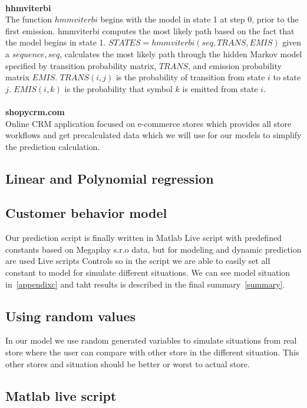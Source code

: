 \\
\textbf{hhmviterbi}~\cite{hhmviterbi}\\
The function $hmmviterbi$ begins with the model in state 1 at step 0, prior to the first emission.
hmmviterbi computes the most likely path based on the fact that the model begins in state 1.
$STATES = hmmviterbi(seq,TRANS,EMIS)$ given a $sequence, seq$, calculates the most likely path through the hidden Markov model
specified by transition probability matrix, $TRANS$, and emission probability matrix $EMIS$. $TRANS(i,j)$ is the probability of transition from state $i$ to state $j$.
$EMIS(i,k)$ is the probability that symbol $k$ is emitted from state $i$.\\
\\
\textbf{shopycrm.com}\\
Online CRM application focused on e-commerce stores which provides all store workflows and get precalculated data which we will use for our models to simplify the prediction calculation.
\newpage
\subsection{Linear and Polynomial regression} \label{sec:baseline}
\subsection{Customer behavior model} \label{sec:cbm}
Our prediction script is finally written in Matlab Live script with predefined constants based on Megaplay s.r.o data,
but for modeling and dynamic prediction are used Live scripts Controls so in the script we are able to easily set all constant to model for simulate different situations. We can see model situation in~\ref{appendixc} and taht results is described in the final summary~\ref{summary}.\\
\subsection{Using random values} \label{subsec:rand}
In our model we use random generated variables to simulate situations from real store where the user can compare with other store in the different situation.
This other stores and situation should be better or worst to actual store.
\subsection{Matlab live script} \label{subsec:matlab}

